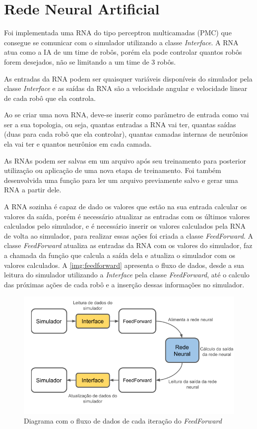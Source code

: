 \section{Rede Neural Artificial}

Foi implementada uma RNA do tipo perceptron multicamadas (PMC) que consegue se comunicar com o simulador utilizando a classe \textit{Interface}. A RNA atua como a IA de um time de robôs, porém ela pode controlar quantos robôs forem desejados, não se limitando a um time de 3 robôs. 

As entradas da RNA podem ser quaisquer variáveis disponíveis do simulador pela classe \textit{Interface} e as saídas da RNA são a velocidade angular e velocidade linear de cada robô que ela controla.

Ao se criar uma nova RNA, deve-se inserir como parâmetro de entrada como vai ser a sua topologia, ou seja, quantas entradas a RNA vai ter, quantas saídas (duas para cada robô que ela controlar), quantas camadas internas de neurônios ela vai ter e quantos neurônios em cada camada.

As RNAs podem ser salvas em um arquivo após seu treinamento para posterior utilização ou aplicação de uma nova etapa de treinamento. Foi também desenvolvida uma função para ler um arquivo previamente salvo e gerar uma RNA a partir dele.

A RNA sozinha é capaz de dado os valores que estão na sua entrada calcular os valores da saída, porém é necessário atualizar as entradas com os últimos valores calculados pelo simulador, e é necessário inserir os valores calculados pela RNA de volta ao simulador, para realizar essas ações foi criada a classe \textit{FeedForward}. A classe \textit{FeedForward} atualiza as entradas da RNA com os valores do simulador, faz a chamada da função que calcula a saída dela e atualiza o simulador com os valores calculados. A \autoref{img:feedforward} apresenta o fluxo de dados, desde a sua leitura do simulador utilizando a \textit{Interface} pela classe \textit{FeedForward}, até o calculo das próximas ações de cada robô e a inserção dessas informações no simulador.

\begin{figure}[!htb]
    \caption{\label{img:feedforward}Diagrama com o fluxo de dados de cada iteração do \textit{FeedForward}}
	\begin{center}
        \includegraphics[scale=0.75]{img/blocos_feedforward.png}
	\end{center}
\end{figure}


